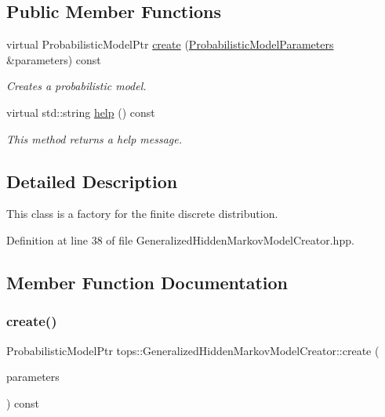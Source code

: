 \subsection*{Public Member Functions}
\begin{DoxyCompactItemize}
\item 
virtual Probabilistic\+Model\+Ptr \hyperlink{classtops_1_1GeneralizedHiddenMarkovModelCreator_a8834cbceabf3922c348c632bb5e660e6}{create} (\hyperlink{classtops_1_1ProbabilisticModelParameters}{Probabilistic\+Model\+Parameters} \&parameters) const
\begin{DoxyCompactList}\small\item\em Creates a probabilistic model. \end{DoxyCompactList}\item 
\mbox{\label{classtops_1_1GeneralizedHiddenMarkovModelCreator_a63ce05184acf1030e338198208d470a4}} 
virtual std\+::string \hyperlink{classtops_1_1GeneralizedHiddenMarkovModelCreator_a63ce05184acf1030e338198208d470a4}{help} () const
\begin{DoxyCompactList}\small\item\em This method returns a help message. \end{DoxyCompactList}\end{DoxyCompactItemize}


\subsection{Detailed Description}
This class is a factory for the finite discrete distribution. 

Definition at line 38 of file Generalized\+Hidden\+Markov\+Model\+Creator.\+hpp.



\subsection{Member Function Documentation}
\mbox{\label{classtops_1_1GeneralizedHiddenMarkovModelCreator_a8834cbceabf3922c348c632bb5e660e6}} 
\subsubsection{\texorpdfstring{create()}{create()}}
{\footnotesize\ttfamily Probabilistic\+Model\+Ptr tops\+::\+Generalized\+Hidden\+Markov\+Model\+Creator\+::create (\begin{DoxyParamCaption}\item[{\hyperlink{classtops_1_1ProbabilisticModelParameters}{Probabilistic\+Model\+Parameters} \&}]{parameters }\end{DoxyParamCaption}) const\hspace{0.3cm}{\ttfamily [virtual]}}



